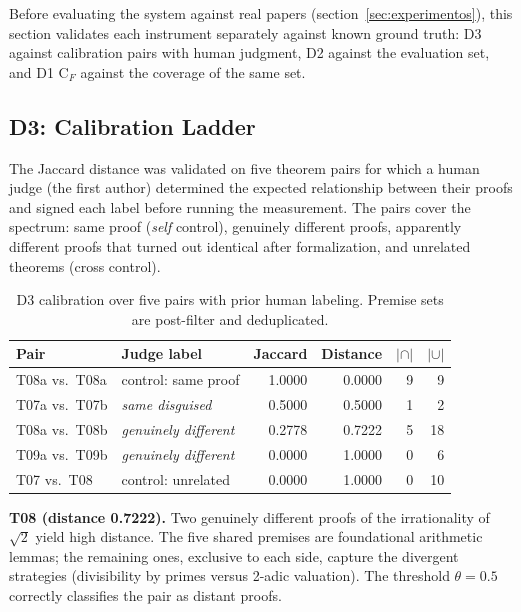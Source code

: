 \documentclass{article}
\theoremstyle{remark}
\begin{document}
\label{sec:instrumentos}

Before evaluating the system against real papers (section~\ref{sec:experimentos}), this section validates each instrument separately against known ground truth: D3 against calibration pairs with human judgment, D2 against the evaluation set, and D1 C$_F$ against the coverage of the same set.

\subsection{D3: Calibration Ladder}
\label{ssec:d3cal}

The Jaccard distance was validated on five theorem pairs for which a human judge (the first author) determined the expected relationship between their proofs and signed each label before running the measurement. The pairs cover the spectrum: same proof (\textit{self} control), genuinely different proofs, apparently different proofs that turned out identical after formalization, and unrelated theorems (cross control).

\begin{table}[htbp]
\centering
\small
\setlength{\tabcolsep}{5pt}
\begin{tabular}{llrrrr}
\toprule
Pair & Judge label & Jaccard & Distance & $|\cap|$ & $|\cup|$ \\
\midrule
T08a vs.\ T08a & control: same proof      & 1.0000 & 0.0000 & 9 & 9 \\
T07a vs.\ T07b & \textit{same disguised}    & 0.5000 & 0.5000 & 1 & 2 \\
T08a vs.\ T08b & \textit{genuinely different} & 0.2778 & 0.7222 & 5 & 18 \\
T09a vs.\ T09b & \textit{genuinely different} & 0.0000 & 1.0000 & 0 & 6 \\
T07 vs.\ T08   & control: unrelated   & 0.0000 & 1.0000 & 0 & 10 \\
\bottomrule
\end{tabular}
\caption{D3 calibration over five pairs with prior human labeling. Premise sets are post-filter and deduplicated.}
\label{tab:d3cal}
\end{table}

\textbf{T08 (distance 0.7222).} Two genuinely different proofs of the irrationality of $\sqrt{2}$ yield high distance. The five shared premises are foundational arithmetic lemmas; the remaining ones, exclusive to each side, capture the divergent strategies (divisibility by primes versus 2-adic valuation). The threshold $\theta = 0.5$ correctly classifies the pair as distant proofs.
\end{document}
